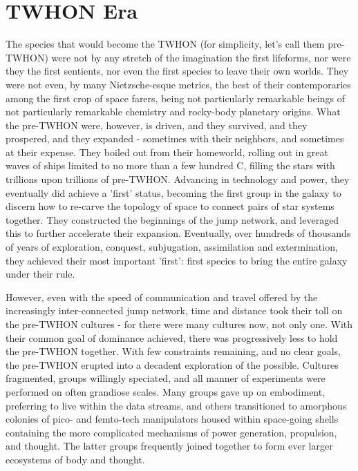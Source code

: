 \section{TWHON Era}
The species that would become the TWHON (for simplicity, let's call 
them pre-TWHON) were not by any stretch of the imagination the first 
lifeforms, nor were they the first sentients, nor even the first 
species to leave their own worlds. They were not even, by many 
Nietzsche-esque metrics, the best of their contemporaries among the first 
crop of space farers, being not particularly remarkable beings of not 
particularly remarkable chemistry and rocky-body planetary 
origins. What the pre-TWHON were, however, is driven, and they 
survived, and they prospered, and they expanded - sometimes with their 
neighbors, and sometimes at their expense. They boiled out from their 
homeworld, rolling out in great waves of ships limited to no more than 
a few hundred C, filling the stars with trillions upon trillions of 
pre-TWHON. Advancing in technology and power, they eventually did 
achieve a 'first' status, becoming the first group in the galaxy to 
discern how to re-carve the topology of space to connect pairs of star 
systems together. They constructed the beginnings of the jump network, 
and leveraged this to further accelerate their expansion. Eventually, 
over hundreds of thousands of years of exploration, conquest, 
subjugation, assimilation and extermination, they achieved their most 
important 'first': first species to bring the entire galaxy under 
their rule. 

However, even with the speed of communication and travel offered by 
the increasingly inter-connected jump network, time and distance took 
their toll on the pre-TWHON cultures - for there were many cultures 
now, not only one. With their common goal of dominance achieved, there 
was progressively less to hold the pre-TWHON together. With few 
constraints remaining, and no clear goals, the pre-TWHON erupted into 
a decadent exploration of the possible. Cultures fragmented, groups 
willingly speciated, and all manner of experiments were performed on 
often grandiose scales. Many groups gave up on embodiment, preferring 
to live within the data streams, and others transitioned to amorphous 
colonies of pico- and femto-tech manipulators housed within 
space-going shells containing the more complicated mechanisms of power 
generation, propulsion, and thought. The latter groups frequently 
joined together to form ever larger ecosystems of body and thought. 

